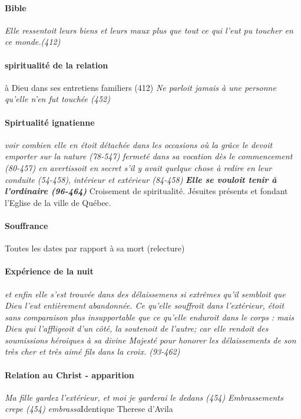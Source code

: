 \paragraph{Bible} \textit{Elle ressentoit leurs biens et leurs maux plus que tout ce qui l'eut pu toucher en ce monde.(412)} 

\paragraph{spiritualité de la relation }{à Dieu dans ses entretiens familiers (412)}
\textit{Ne parloit jamais à une personne qu'elle n'en fut touchée (452)}

\paragraph{Spirtualité ignatienne}
\textit{voir combien elle en étoit détachée dans les occasions où la grâce le devoit emporter sur la nature (78-547)}
\textit{fermeté dans sa vocation dès le commencement (80-457) \textit{en avertissoit en secret s'il y avait quelque chose à redire en leur conduite (54-458)}}, \textit{intérieur et extérieur (84-458)} \textit{\textbf{Elle se vouloit tenir à l'ordinaire (96-464)}}
Croisement de spiritualité. Jésuites présents et fondant l'Eglise de la ville de Québec.


\paragraph{Souffrance} Toutes les dates par rapport à sa mort (relecture) 


\paragraph{Expérience de la nuit} \textit{et enfin elle s'est trouvée dans des délaissemens si extrêmes qu'il sembloit que Dieu l'eut entièrement abandonnée. Ce qu'elle souffroit dans l'extérieur, étoit sans comparaison plus insupportable que ce qu'elle enduroit dans le corps : mais Dieu qui l'affligeoit d'un côté, la soutenoit de l'autre; car elle rendoit des soumissions héroiques à sa divine Majesté pour honorer les délaissements de son très cher et très aimé fils dans la croix. (93-462)}
\paragraph{Relation au Christ - apparition} \textit{Ma fille gardez l'extérieur, et moi je garderai le dedans (454)} \textit{Embrassements} \textit{crepe (454)} \textit{embrassa}Identique Therese d'Avila



